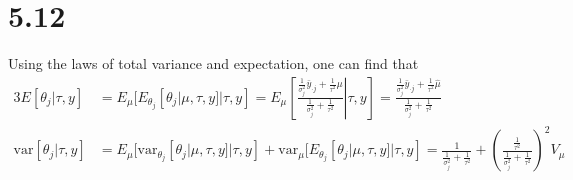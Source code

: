 \documentclass[12pt]{article}
\begin{document}
\section*{5.12} Using the laws of total variance and expectation, one can find that
\begin{alignat*}{3}
E[\theta_j|\tau, y]&=E_\mu[E_{\theta_j}[\theta_j|\mu,\tau,y]|\tau,y]=E_\mu \left[\left.\frac{\frac{1}{\sigma^2_j}\bar{y}_{\cdot j}+\frac{1}{\tau^2}\mu}{\frac{1}{\sigma_j^2}+\frac{1}{\tau^2}} \right|  \tau,y \right]=\frac{\frac{1}{\sigma^2_j}\bar{y}_{\cdot j}+\frac{1}{\tau^2}\hat{\mu}}{\frac{1}{\sigma_j^2}+\frac{1}{\tau^2}} \\
\text{var}[\theta_j|\tau, y]&=E_\mu[\text{var}_{\theta_j}[\theta_j|\mu,\tau,y]|\tau,y]+\text{var}_\mu[E_{\theta_j}[\theta_j|\mu,\tau,y]|\tau,y]=\frac{1}{\frac{1}{\sigma_j^2}+\frac{1}{\tau^2}}+\left(\frac{\frac{1}{\tau^2}}{\frac{1}{\sigma_j^2}+\frac{1}{\tau^2}}\right)^2V_\mu
\end{alignat*}
\end{document}

